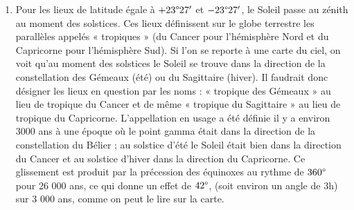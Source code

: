 \documentclass[a4paper,10pt]{report}
\renewcommand{\deg}{\ensuremath{\degree}}
\begin{document}
\begin{Answer}
\begin{enumerate}
  \item Pour les lieux de latitude égale à $+23\deg27'$ et
    $-23\deg27'$, le Soleil passe au zénith au moment des
    solstices. Ces lieux définissent sur le globe terrestre les
    parallèles appelés « tropiques » (du Cancer pour l'hémisphère Nord
    et du Capricorne pour l'hémisphère Sud). Si l'on se reporte à une
    carte du ciel, on voit qu'au moment des solstices le Soleil se
    trouve dans la direction de la constellation des Gémeaux (été) ou
    du Sagittaire (hiver). Il faudrait donc désigner les lieux en
    question par les noms : « tropique des Gémeaux » au lieu de
    tropique du Cancer et de même « tropique du Sagittaire » au lieu
    de tropique du Capricorne. L'appellation en usage a été définie il
    y a environ 3000 ans à une époque où le point gamma était dans la
    direction de la constellation du Bélier ; au solstice d'été le
    Soleil était bien dans la direction du Cancer et au solstice
    d'hiver dans la direction du Capricorne. Ce glissement est produit
    par la précession des équinoxes au rythme de $360\deg$ pour 26
    000 ans, ce qui donne un effet de $42\deg$, (soit environ un
    angle de 3h) sur 3 000 ans, comme on peut le lire sur la carte.
\end{enumerate}
\end{Answer}
\end{document}
